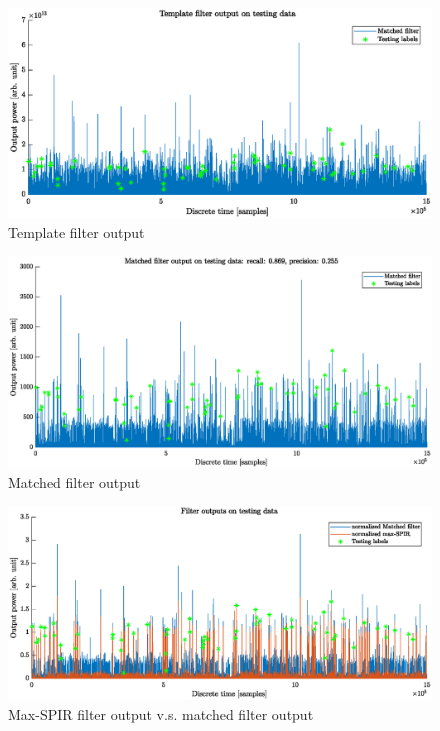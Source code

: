\documentclass[pagesize,english,DIV=calc,footinclude=false
]{scrartcl}
\begin{document}
\begin{figure}[htbp]
  \centering
  \includegraphics[width=\linewidth]{template_testing.eps}
  \caption{Template filter output}
  \label{fig:template_filt}
\end{figure}

\begin{figure}[htbp]
  \centering
  \includegraphics[width=\linewidth]{matched_testing.eps}
  \caption{Matched filter output}
  \label{fig:matched_filt}
\end{figure}

\begin{figure}[htbp]
  \centering
  \includegraphics[width=\linewidth]{SPIR_testing.eps}
  \caption{Max-SPIR filter output v.s. matched filter output}
  \label{fig:SPIR_filt}
\end{figure}
\end{document}
